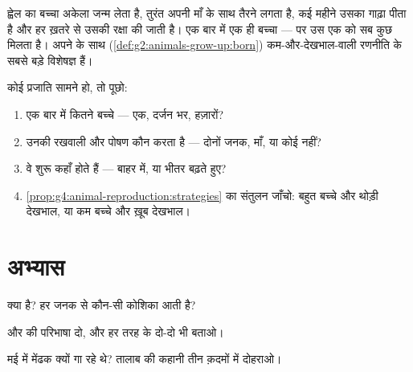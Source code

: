 \begin{example}[दूसरा सिरा]\label{ex:g4:animal-reproduction:whalecalf}
ह्वेल का बच्चा अकेला जन्म लेता है, तुरंत अपनी माँ के साथ तैरने लगता
है, कई महीने उसका गाढ़ा  पीता है और हर ख़तरे से उसकी रक्षा की जाती
है। एक बार में एक ही बच्चा --- पर उस एक को सब कुछ मिलता है। अपने 
के साथ (\cref{def:g2:animals-grow-up:born}) 
कम-और-देखभाल-वाली रणनीति के सबसे बड़े विशेषज्ञ हैं।
\end{example}

\begin{method}[किसी प्रजाति की रणनीति पढ़ना]\label{met:g4:animal-reproduction:read}
कोई प्रजाति सामने हो, तो पूछो:
\begin{enumerate}
  \item एक बार में कितने बच्चे --- एक, दर्जन भर, हज़ारों?
  \item उनकी रखवाली और पोषण कौन करता है --- दोनों जनक, माँ, या कोई
        नहीं?
  \item वे शुरू कहाँ होते हैं --- बाहर  में, या भीतर बढ़ते हुए?
  \item \cref{prop:g4:animal-reproduction:strategies} का संतुलन
        जाँचो: बहुत बच्चे और थोड़ी देखभाल, या कम बच्चे और ख़ूब
        देखभाल।
\end{enumerate}
\end{method}

\section{अभ्यास}

\begin{exercise}[$\star$]\label{exo:g4:animal-reproduction:1}
 क्या है? हर जनक से कौन-सी कोशिका आती है?
\end{exercise}

\begin{exercise}[$\star$]\label{exo:g4:animal-reproduction:2}
 और  की परिभाषा दो, और हर तरह के दो-दो  भी बताओ।
\end{exercise}

\begin{exercise}[$\star$]\label{exo:g4:animal-reproduction:3}
मई में मेंढक क्यों गा रहे थे? तालाब की कहानी तीन क़दमों में दोहराओ।
\end{exercise}

